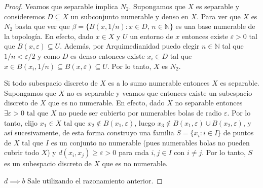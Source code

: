 \documentclass{article}
\theoremstyle{definition}
\newcommand{\N}{\mathbb{N}}
\begin{document}
\begin{proof}
    Veamos que separable implica \( N_2 \). Supongamos que \( X \) es separable y consideremos \( D \subseteq X \) un subconjunto numerable y denso en \( X \).
    Para ver que \( X \) es \( N_2 \) basta que ver que \( \beta = \{ B(x, 1/n) : x \in D, \, n \in \N \} \) es una base numerable de la topología.
    En efecto, dado \( x \in X \) y \( U \) un entorno de \( x \) entonces existe \( \varepsilon > 0 \) tal que \( B(x, \varepsilon) \subseteq U \). Además, por Arquimedianidad puedo elegir \( n \in \N \) tal que
    \( 1/n < \varepsilon/2 \) y como \( D \) es denso entonces existe \( x_i \in D \) tal que \( x \in B(x_i, 1/n) \subseteq B(x, \varepsilon) \subseteq U \). Por lo tanto, \( X \) es \( N_2 \).

    Si todo subespacio discreto de \( X \) es a lo sumo numerable entonces \( X \) es separable. Supongamos que \( X \) no es separable y veamos que entonces existe un subespacio discreto de \( X \) que es no numerable.
    En efecto, dado \( X \) no separable entonces \( \exists \varepsilon > 0 \) tal que \( X \) no puede ser cubierto por numerables bolas de radio \( \varepsilon \). Por lo tanto, elijo
    \( x_1 \in X \) tal que \( x_2 \notin B(x_1, \varepsilon) \), luego \( x_3 \notin B(x_1, \varepsilon) \cup B(x_2, \varepsilon) \), y así sucesivamente, de esta forma construyo una familia \( S = \{ x_i : i \in I \} \) de puntos de \( X \) tal que \( I \) es un conjunto no numerable (pues numerables bolas no pueden cubrir todo \( X \)) y \( d(x_i, x_j) \geq \varepsilon > 0 \) para cada \( i, j \in I \) con \( i \neq j \).
    Por lo tanto, \( S \) es un subespacio discreto de \( X \) que es no numerable.

    \( d \implies b \) Sale utilizando el razonamiento anterior.
\end{proof}
\end{document}
